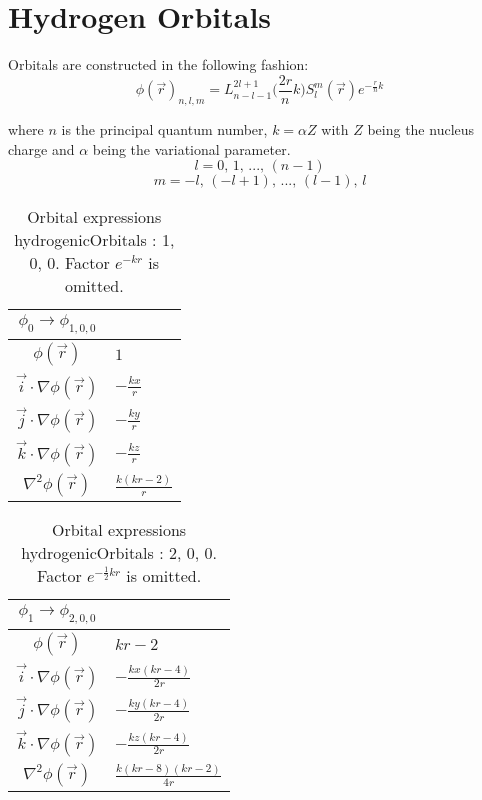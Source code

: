 \chapter{Hydrogen Orbitals}
\label{appendix:SymPyHydro}

Orbitals are constructed in the following fashion:
\begin{equation*}
\phi(\vec r)_{n, l, m} = L_{n - l - 1}^{2l + 1}\Big(\frac{2r}{n}k\Big)S_{l}^{m}(\vec r)e^{-\frac{r}{n}k}
\end{equation*}   

where $n$ is the principal quantum number, $k = \alpha Z$ with $Z$ being the nucleus charge and 
$\alpha$ being the variational parameter.
$$l = 0,\, 1,\, ...,\, (n-1)$$ 
$$m = -l,\, (-l + 1),\, ...,\, (l-1),\, l$$
  
\newpage



\begin{table}
\begin{center}
\begin{tabular}{c|l}
$\phi_{0} \rightarrow \phi_{1, 0, 0}$\\
\hline
$\phi(\vec r)$ & $1$\\
\hline
$\vec i\cdot \nabla \phi(\vec r)$ & $- \frac{k x}{r}$\\
$\vec j\cdot \nabla \phi(\vec r)$ & $- \frac{k y}{r}$\\
$\vec k\cdot \nabla \phi(\vec r)$ & $- \frac{k z}{r}$\\
\hline
$\nabla^2 \phi(\vec r)$ & $\frac{k \left(k r -2\right)}{r}$\\
\end{tabular}
\caption{Orbital expressions hydrogenicOrbitals : 1, 0, 0. Factor $e^{- k r}$ is omitted.}
\end{center}
\end{table}


\begin{table}
\begin{center}
\begin{tabular}{c|l}
$\phi_{1} \rightarrow \phi_{2, 0, 0}$\\
\hline
$\phi(\vec r)$ & $k r -2$\\
\hline
$\vec i\cdot \nabla \phi(\vec r)$ & $- \frac{k x \left(k r -4\right)}{2 r}$\\
$\vec j\cdot \nabla \phi(\vec r)$ & $- \frac{k y \left(k r -4\right)}{2 r}$\\
$\vec k\cdot \nabla \phi(\vec r)$ & $- \frac{k z \left(k r -4\right)}{2 r}$\\
\hline
$\nabla^2 \phi(\vec r)$ & $\frac{k \left(k r -8\right) \left(k r -2\right)}{4 r}$\\
\end{tabular}
\caption{Orbital expressions hydrogenicOrbitals : 2, 0, 0. Factor $e^{- \frac{1}{2} k r}$ is omitted.}
\end{center}
\end{table}



